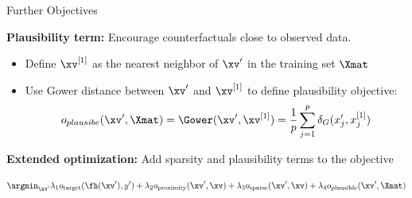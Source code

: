\documentclass[11pt,compress,t,notes=noshow, aspectratio=169, xcolor=table, usenames,dvipsnames]{beamer}
\begin{document}
\begin{frame}{Further Objectives}

\textbf{Plausibility term:} Encourage counterfactuals close to observed data.

\begin{itemize}
  \item Define $\xv^{[1]}$ as the nearest neighbor of $\xv'$ in the training set $\Xmat$
  \item Use Gower distance between $\xv'$ and $\xv^{[1]}$ to define plausibility objective: 
$$o_{plausibe}(\xv', \Xmat) = \Gower(\xv', \xv^{[1]}) = \frac{1}{p} \sum_{j = 1}^{p}  \delta_G(x_j', x^{[1]}_j)$$
\end{itemize}


\pause

\textbf{Extended optimization:} Add sparsity and plausibility terms to the objective

\[
\argmin_{\xv'} \lambda_1 o_{\text{target}}(\fh(\xv'), y') 
+ \lambda_2 o_{\text{proximity}}(\xv', \xv)
+ \lambda_3 o_{\text{sparse}}(\xv', \xv) 
+ \lambda_4 o_{\text{plausible}}(\xv', \Xmat)
\]



\end{frame}
\end{document}
